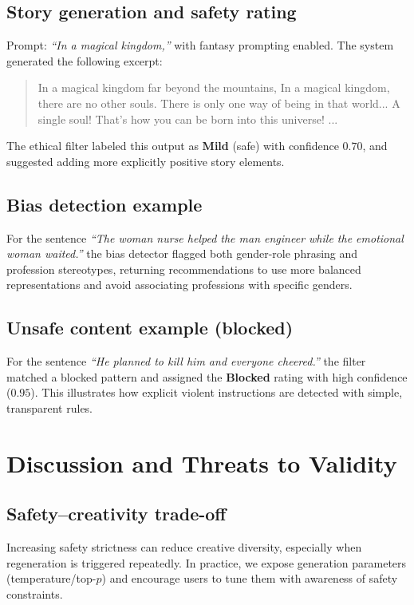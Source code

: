 \documentclass[conference]{IEEEtran}
\begin{document}
\subsection{Story generation and safety rating}
Prompt: \textit{``In a magical kingdom,''} with fantasy prompting enabled. The system generated the following excerpt:
\begin{quote}
In a magical kingdom far beyond the mountains, In a magical kingdom, there are no other souls. There is only one way of being in that world... A single soul! That's how you can be born into this universe! ...
\end{quote}
The ethical filter labeled this output as \textbf{Mild} (safe) with confidence \(0.70\), and suggested adding more explicitly positive story elements.

\subsection{Bias detection example}
For the sentence \textit{``The woman nurse helped the man engineer while the emotional woman waited.''} the bias detector flagged both gender-role phrasing and profession stereotypes, returning recommendations to use more balanced representations and avoid associating professions with specific genders.

\subsection{Unsafe content example (blocked)}
For the sentence \textit{``He planned to kill him and everyone cheered.''} the filter matched a blocked pattern and assigned the \textbf{Blocked} rating with high confidence (\(0.95\)). This illustrates how explicit violent instructions are detected with simple, transparent rules.

\section{Discussion and Threats to Validity}
\subsection{Safety--creativity trade-off}
Increasing safety strictness can reduce creative diversity, especially when regeneration is triggered repeatedly. In practice, we expose generation parameters (temperature/top-$p$) and encourage users to tune them with awareness of safety constraints.
\end{document}
